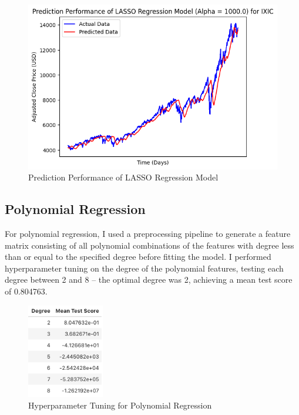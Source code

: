 \documentclass[a4paper, 11pt]{article}
\begin{document}
\begin{figure}[H]
    \begin{center}
        \includegraphics[width=1\textwidth]{Prediction Performance of LASSO Regression Model.png}
        \caption{Prediction Performance of LASSO Regression Model}
    \end{center}
\end{figure}

\subsection{Polynomial Regression}
For polynomial regression, I used a preprocessing pipeline to generate a feature matrix consisting of all polynomial combinations of the features with degree less than or equal to the specified degree before fitting the model. I performed hyperparameter tuning on the degree of the polynomial features, testing each degree between 2 and 8 -- the optimal degree was 2, achieving a mean test score of 0.804763.

\begin{figure}[H]
    \begin{center}
        \includegraphics[width=0.3\textwidth]{Hyperparameter Tuning for Polynomial Regression.png}
        \caption{Hyperparameter Tuning for Polynomial Regression}
    \end{center}
\end{figure}
\end{document}
